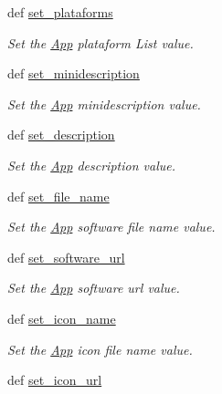 \begin{CompactItemize}
def \hyperlink{classwinsollib_1_1App_8420ea0b005195177bf4f62dbbaa749f}{set\_\-plataforms}
\begin{CompactList}\small\item\em Set the \hyperlink{classwinsollib_1_1App}{App} plataform List value. \item\end{CompactList}\item 
def \hyperlink{classwinsollib_1_1App_7187322bf1593b14b2bb60fac8ed07fe}{set\_\-minidescription}
\begin{CompactList}\small\item\em Set the \hyperlink{classwinsollib_1_1App}{App} minidescription value. \item\end{CompactList}\item 
def \hyperlink{classwinsollib_1_1App_b6ff31455b7695f3798c22fc4c457049}{set\_\-description}
\begin{CompactList}\small\item\em Set the \hyperlink{classwinsollib_1_1App}{App} description value. \item\end{CompactList}\item 
def \hyperlink{classwinsollib_1_1App_ff314b21ddd0858fb855e6f841d4205d}{set\_\-file\_\-name}
\begin{CompactList}\small\item\em Set the \hyperlink{classwinsollib_1_1App}{App} software file name value. \item\end{CompactList}\item 
def \hyperlink{classwinsollib_1_1App_598bc6c69cd3a5f4edeba566ddfda333}{set\_\-software\_\-url}
\begin{CompactList}\small\item\em Set the \hyperlink{classwinsollib_1_1App}{App} software url value. \item\end{CompactList}\item 
def \hyperlink{classwinsollib_1_1App_9a64e8cece58eca7dacf29f213757f1b}{set\_\-icon\_\-name}
\begin{CompactList}\small\item\em Set the \hyperlink{classwinsollib_1_1App}{App} icon file name value. \item\end{CompactList}\item 
def \hyperlink{classwinsollib_1_1App_6e2e332bc002d98936b5e3d94a45da5a}{set\_\-icon\_\-url}

\end{CompactItemize}
